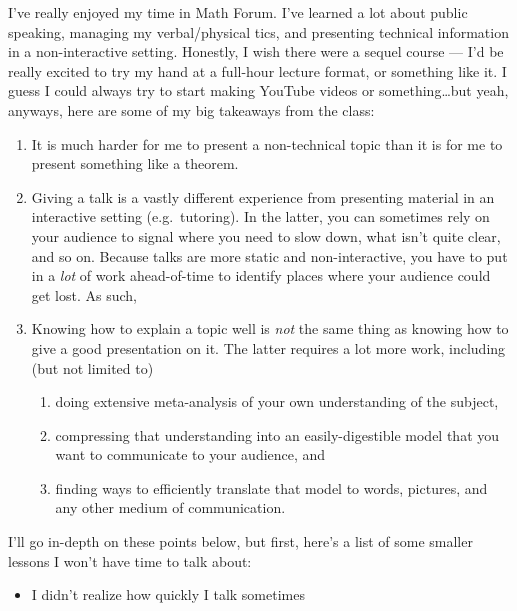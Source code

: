 \documentclass{fkpset}
\begin{document}
\begin{solution}[Response.]
  \setlength{\parindent}{2em}

  I've really enjoyed my time in Math Forum. I've learned a lot about
  public speaking, managing my verbal/physical tics, and presenting
  technical information in a non-interactive setting. Honestly, I wish
  there were a sequel course --- I'd be really excited to try my hand
  at a full-hour lecture format, or something like it. I guess I could
  always try to start making YouTube videos or something\ldots but
  yeah, anyways, here are some of my big takeaways from the class:
  \begin{enumerate}[label=\arabic*)]
    \item It is much harder for me to present a non-technical topic
      than it is for me to present something like a theorem.
    \item Giving a talk is a vastly different experience from
      presenting material in an interactive setting (e.g.\ tutoring).
      In the latter, you can sometimes rely on your audience to signal
      where you need to slow down, what isn't quite clear, and so on.
      Because talks are more static and non-interactive, you have to
      put in a \emph{lot} of work ahead-of-time to identify places
      where your audience could get lost. As such,
    \item Knowing how to explain a topic well is \emph{not} the same
      thing as knowing how to give a good presentation on it. The
      latter requires a lot more work, including (but not limited to)
      \begin{enumerate}
        \item doing extensive meta-analysis of your own understanding
          of the subject,
        \item compressing that understanding into an easily-digestible
          model that you want to communicate to your audience, and
        \item finding ways to efficiently translate that model to
          words, pictures, and any other medium of communication.
      \end{enumerate}
  \end{enumerate}
  I'll go in-depth on these points below, but first, here's a list of
  some smaller lessons I won't have time to talk about:
  \begin{multicols}{2}
  \begin{itemize}
    \item I didn't realize how quickly I talk sometimes

\end{itemize}
\end{multicols}
\end{solution}
\end{document}

